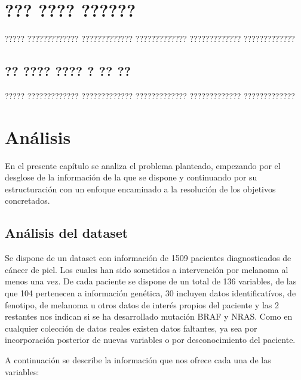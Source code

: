 \documentclass[11pt,spanish,listoffigures,listoftables]{tfgetsinf}
\begin{document}
\chapter{??? ???? ??????}

????? ????????????? ????????????? ????????????? ????????????? ?????????????

\section{?? ???? ???? ? ?? ??}

????? ????????????? ????????????? ????????????? ????????????? ?????????????


\chapter{An\'alisis}

En el presente cap\'itulo se analiza el problema planteado, empezando por el desglose de la informaci\'on de la que se dispone y continuando por su estructuraci\'on con un enfoque encaminado a la resoluci\'on de los objetivos concretados.

\section{An\'alisis del dataset}

Se dispone de un dataset con informaci\'on de 1509 pacientes diagnosticados de c\'ancer de piel. Los cuales han sido sometidos a intervenci\'on por melanoma al menos una vez.
De cada paciente se dispone de un total de 136 variables, de las que 104 pertenecen a informaci\'on gen\'etica, 30 incluyen datos identificat\'ivos, de fenotipo, de melanoma u otros datos de inter\'es propios del paciente y las 2 restantes nos indican si se ha desarrollado mutaci\'on BRAF y NRAS.\newline
Como en cualquier colecci\'on de datos reales existen datos faltantes, ya sea por incorporaci\'on posterior de nuevas variables o por desconocimiento del paciente.

A continuaci\'on se describe la informaci\'on que nos ofrece cada una de las variables:
\end{document}
